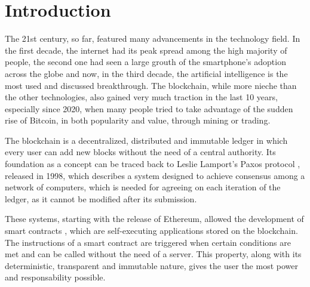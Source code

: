 \begin{abstract}
    The Blockchain, despite its popularity and presence on the internet and in the financial sector, is a relatively new technology and this fact is proved by the large amount of attacks that took place on such networks over the years. This situation raises the need for secure and robust networks that can keep the clients’ financial assets safe. Fortunately, there are various solutions to this category of problems, like Slither or Manticore, which take different approaches towards finding vulnerabilities. For the moment, most of these tools provide an at least decent detection for a high variety of attacks, but they need to get used more in order to ensure a higher standard of security when it comes to smart contracts. A good way to achieve this is to integrate the scanning tools into user-friendly applications that shorten the process of analyzing and fixing vulnerabilities.
\end{abstract}

\chapter*{Introduction} 

The 21st century, so far, featured many advancements in the technology field. In the first decade, the internet had its peak spread among the high majority of people, the second one had seen a large grouth of the smartphone's adoption across the globe and now, in the third decade, the artificial intelligence is the most used and discussed breakthrough. The blockchain, while more nieche than the other technologies, also gained very much traction in the last 10 years, especially since 2020, when many people tried to take advantage of the sudden rise of Bitcoin, in both popularity and value, through mining or trading.

The blockchain is a decentralized, distributed and immutable ledger in which every user can add new blocks without the need of a central authority. Its foundation as a concept can be traced back to Leslie Lamport's Paxos protocol \cite{paxos}, released in 1998, which describes a system designed to achieve consensus among a network of computers, which is needed for agreeing on each iteration of the ledger, as it cannot be modified after its submission.

These systems, starting with the release of Ethereum, allowed the development of smart contracts \cite{smartContracts}, which are self-executing applications stored on the blockchain. The instructions of a smart contract are triggered when certain conditions are met and can be called without the need of a server. This property, along with its deterministic, transparent and immutable nature, gives the user the most power and responsability possible.

